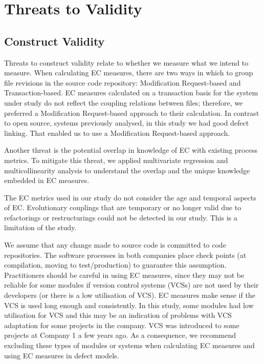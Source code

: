 \documentclass[times]{smrauth}
\begin{document}

\section{Threats to Validity}

\subsection{Construct Validity}

Threats to construct validity relate to whether we measure what we intend to measure. When calculating EC measures, there are two ways in which to group file revisions in the source code repository: Modification Request-based and Transaction-based. EC measures calculated on a transaction basis for the system under study do not reflect the coupling relations between files; therefore, we preferred a Modification Request-based approach to their calculation. In contrast to open source, systems previously analysed, in this study we had good defect linking. That enabled us to use a Modification Request-based approach. 

Another threat is the potential overlap in knowledge of EC with existing process metrics. To mitigate this threat, we applied multivariate regression and multicollinearity analysis to understand the overlap and the unique knowledge embedded in EC measures.

The EC metrics used in our study do not consider the age and temporal aspects of EC. Evolutionary couplings that are temporary or no longer valid due to refactorings or restructurings could not be detected in our study. This is a limitation of the study.

We assume that any change made to source code is committed to code repositories. The software processes in both companies place check points (at compilation, moving to test/production) to guarantee this assumption. Practitioners should be careful in using EC measures, since they may not be reliable for some modules if version control systems (VCSs) are not used by their developers (or there is a low utilisation of VCS). EC measures make sense if the VCS is used long enough and consistently. In this study, some modules had low utilisation for VCS and this may be an indication of problems with VCS adaptation for some projects in the company. VCS was introduced to some projects at Company 1 a few years ago. As a consequence, we recommend excluding these types of modules or systems when calculating EC measures and using EC measures in defect models.
\end{document}
